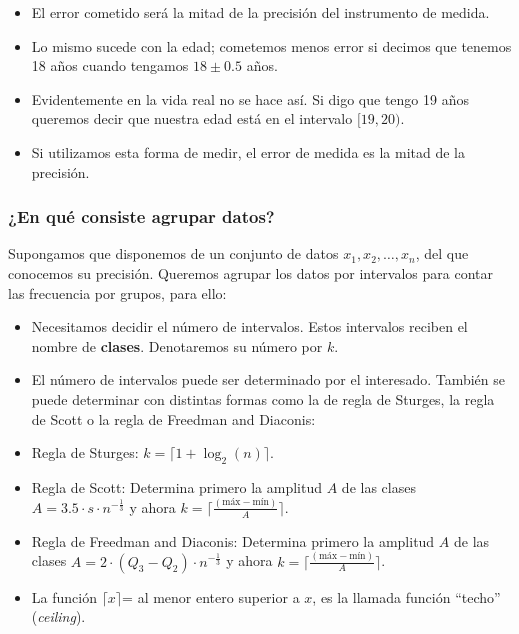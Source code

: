 \begin{frame}
\begin{itemize}
\item El error cometido será la mitad de la precisión del instrumento de medida.
\item  Lo mismo sucede con la edad; cometemos menos error si decimos que tenemos 18 años cuando tengamos $18\pm 0.5$ años.
\item Evidentemente en la vida real no se hace así. Si digo que tengo 19 años queremos decir que nuestra edad está en el intervalo $[19,20)$.
\item  Si utilizamos esta forma de medir, el error de medida es la mitad de la precisión.
\end{itemize}
\end{frame}

\begin{frame}
\frametitle{ ¿En qué consiste agrupar datos?}
Supongamos que disponemos de un conjunto de datos $x_1,x_2,\ldots, x_n$, del que conocemos su precisión.
Queremos agrupar los datos por intervalos para contar las frecuencia por grupos, para ello:
\begin{itemize}
\item Necesitamos decidir el número de intervalos. Estos intervalos reciben el nombre de \textbf{clases}. Denotaremos su número por $k$.
\item El número de intervalos  puede ser determinado por el interesado. También se puede determinar con distintas formas como la de regla de Sturges, la regla de Scott o la regla de Freedman and Diaconis:
\end{itemize}
\end{frame}

\begin{frame}
\begin{itemize}
\item  Regla de Sturges: $k= \lceil 1+\log_{2}(n) \rceil.$
\item  Regla de Scott: Determina primero la amplitud $A$ de las clases  $A= 3.5 \cdot s \cdot n^{-\frac{1}{3}}$ y  ahora $k=\lceil \frac{(\mbox{máx} -\mbox{mín})}{A}\rceil$.
\item  Regla de Freedman and Diaconis: Determina primero la amplitud $A$ de las clases  $A= 2 \cdot (Q_3-Q_2) \cdot n^{-\frac{1}{3}}$ y  ahora $k=\lceil \frac{(\mbox{máx} -\mbox{mín})}{A}\rceil$.
\item La función $\lceil x \rceil$= al menor entero superior a $x$, es la llamada función ``techo'' (\textsl{ceiling}).
\end{itemize}
\end{frame}

